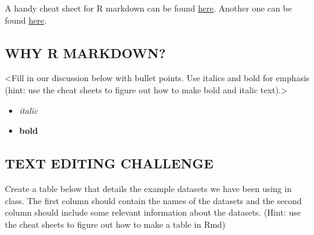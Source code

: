 \documentclass[]{article}
\providecommand{\tightlist}{%
  \setlength{\itemsep}{0pt}\setlength{\parskip}{0pt}}
\begin{document}
A handy cheat sheet for R markdown can be found
\href{https://www.rstudio.com/wp-content/uploads/2015/03/rmarkdown-reference.pdf}{here}.
Another one can be found
\href{https://www.rstudio.com/wp-content/uploads/2015/02/rmarkdown-cheatsheet.pdf}{here}.

\hypertarget{why-r-markdown}{%
\subsection{WHY R MARKDOWN?}\label{why-r-markdown}}

\textless{}Fill in our discussion below with bullet points. Use italics
and bold for emphasis (hint: use the cheat sheets to figure out how to
make bold and italic text).\textgreater{}

\begin{itemize}
\tightlist
\item
  \emph{italic}
\item
  \textbf{bold}
\end{itemize}

\hypertarget{text-editing-challenge}{%
\subsection{TEXT EDITING CHALLENGE}\label{text-editing-challenge}}

Create a table below that details the example datasets we have been
using in class. The first column should contain the names of the
datasets and the second column should include some relevant information
about the datasets. (Hint: use the cheat sheets to figure out how to
make a table in Rmd)
\end{document}
